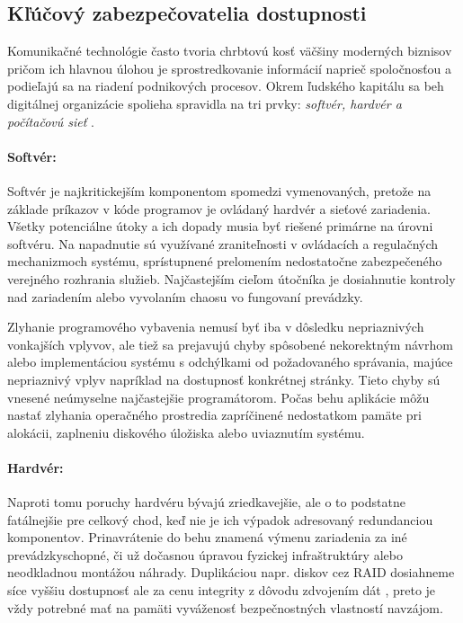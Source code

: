\documentclass[12pt, a4paper]{article}
\begin{document}
\subsection{Kľúčový zabezpečovatelia dostupnosti}
Komunikačné technológie často tvoria chrbtovú kosť väčšiny moderných biznisov pričom ich hlavnou úlohou je 
sprostredkovanie informácií naprieč spoločnosťou a podieľajú sa na riadení podnikových procesov. Okrem 
ľudského kapitálu sa beh digitálnej organizácie spolieha spravidla na tri prvky: \emph{softvér, hardvér a 
počítačovú sieť} \cite{availability}. 

\paragraph{Softvér:}
Softvér je najkritickejším komponentom spomedzi vymenovaných, pretože na základe príkazov v kóde programov 
je ovládaný hardvér a sieťové zariadenia. Všetky potenciálne útoky a ich dopady musia byť riešené primárne 
na úrovni softvéru. Na napadnutie sú využívané zraniteľnosti v ovládacích a regulačných mechanizmoch 
systému, sprístupnené prelomením nedostatočne zabezpečeného verejného rozhrania služieb. Najčastejším cieľom 
útočníka je dosiahnutie kontroly nad zariadením alebo vyvolaním chaosu vo fungovaní prevádzky. 
 
Zlyhanie programového vybavenia nemusí byť iba v dôsledku nepriaznivých vonkajších vplyvov, ale tiež sa 
prejavujú chyby spôsobené nekorektným návrhom alebo implementáciou systému s odchýlkami od
požadovaného správania, majúce nepriaznivý vplyv napríklad na dostupnosť konkrétnej stránky. Tieto chyby sú 
vnesené neúmyselne najčastejšie programátorom. Počas behu aplikácie môžu nastať zlyhania operačného 
prostredia zapríčinené nedostatkom pamäte pri alokácii, zaplneniu diskového úložiska alebo uviaznutím 
systému. 

\paragraph{Hardvér:}
Naproti tomu poruchy hardvéru bývajú zriedkavejšie, ale o to podstatne fatálnejšie pre celkový chod, keď
nie je ich výpadok adresovaný redundanciou komponentov. Prinavrátenie do behu znamená výmenu zariadenia za 
iné prevádzkyschopné, či už dočasnou úpravou fyzickej infraštruktúry alebo neodkladnou montážou náhrady. 
Duplikáciou napr. diskov cez RAID dosiahneme síce vyššiu dostupnosť ale za cenu integrity z dôvodu zdvojením 
dát \cite{availability}, preto je vždy potrebné mať na pamäti vyváženosť bezpečnostných vlastností navzájom.
\end{document}
